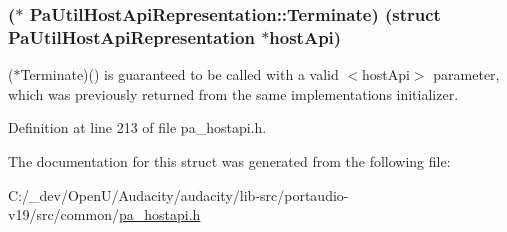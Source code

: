 \subsubsection[{\texorpdfstring{Terminate}{Terminate}}]{($\ast$ Pa\+Util\+Host\+Api\+Representation\+::\+Terminate) (struct {\bf Pa\+Util\+Host\+Api\+Representation} $\ast$host\+Api)}\hypertarget{struct_pa_util_host_api_representation_a832b3f01b9d9a84b5442e27d365f8b9f}{}\label{struct_pa_util_host_api_representation_a832b3f01b9d9a84b5442e27d365f8b9f}
($\ast$\+Terminate)() is guaranteed to be called with a valid $<$host\+Api$>$ parameter, which was previously returned from the same implementation\textquotesingle{}s initializer. 

Definition at line 213 of file pa\+\_\+hostapi.\+h.



The documentation for this struct was generated from the following file\+:\begin{DoxyCompactItemize}
\item 
C\+:/\+\_\+dev/\+Open\+U/\+Audacity/audacity/lib-\/src/portaudio-\/v19/src/common/\hyperlink{pa__hostapi_8h}{pa\+\_\+hostapi.\+h}\end{DoxyCompactItemize}
